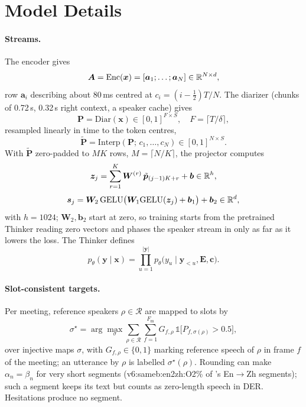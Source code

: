 \section{Model Details}
\label{app:model}

\paragraph{Streams.} The encoder gives
\begin{equation}
\bm{A}=\mathrm{Enc}(\bm{x})=[\bm{a}_1;\dots;\bm{a}_N]\in\mathbb{R}^{N\times d},
\label{eq:enc}
\end{equation}
row $\bm{a}_i$ describing about 80\,ms centred at $c_i=(i-\tfrac12)T/N$. The diarizer (chunks of 0.72\,s, 0.32\,s right
context, a speaker cache) gives
\begin{equation}
\bm{P}=\mathrm{Diar}(\bm{x})\in[0,1]^{F\times S},\quad F=\lceil T/\delta\rceil,
\label{eq:diar}
\end{equation}
resampled linearly in time to the token centres,
\begin{equation}
\tilde{\bm{P}}=\mathrm{Interp}(\bm{P};\,c_1,\dots,c_N)\in[0,1]^{N\times S}.
\label{eq:interp}
\end{equation}
With $\tilde{\bm{P}}$ zero-padded to $MK$ rows, $M=\lceil N/K\rceil$, the projector computes
\begin{equation}
\bm{z}_j=\sum_{r=1}^{K}\bm{W}^{(r)}\,\tilde{\bm{p}}_{(j-1)K+r}+\bm{b}\in\mathbb{R}^{h},
\label{eq:conv}
\end{equation}
\begin{equation}
\bm{s}_j=\bm{W}_2\,\mathrm{GELU}\big(\bm{W}_1\mathrm{GELU}(\bm{z}_j)+\bm{b}_1\big)+\bm{b}_2\in\mathbb{R}^{d},
\label{eq:mlp}
\end{equation}
with $h=1024$; $\bm{W}_2,\bm{b}_2$ start at zero, so training starts from the pretrained Thinker reading zero vectors and
phases the speaker stream in only as far as it lowers the loss. The Thinker defines
\begin{equation}
p_\theta(\bm{y}\mid\bm{x})=\prod_{u=1}^{|\bm{y}|}p_\theta\big(y_u\mid \bm{y}_{<u},\bm{E},\bm{c}\big).
\label{eq:ar}
\end{equation}

\paragraph{Slot-consistent targets.} Per meeting, reference speakers $\rho\in\mathcal{R}$ are mapped to slots by
\begin{equation}
\sigma^\star=\arg\max_{\sigma}\sum_{\rho\in\mathcal{R}}\sum_{f=1}^{F_\text{m}}
G_{f,\rho}\,\mathds{1}\big[P_{f,\sigma(\rho)}>0.5\big],
\label{eq:slotmap}
\end{equation}
over injective maps $\sigma$, with $G_{f,\rho}\in\{0,1\}$ marking reference speech of $\rho$ in frame $f$ of the meeting;
an utterance by $\rho$ is labelled $\sigma^\star(\rho)$. Rounding can make $\alpha_n=\beta_n$ for very short segments
(\num{v6:sameb:en2zh:O2}\% of \sys{}'s En$\rightarrow$Zh segments); such a segment keeps its text but counts as
zero-length speech in DER. Hesitations produce no segment.

